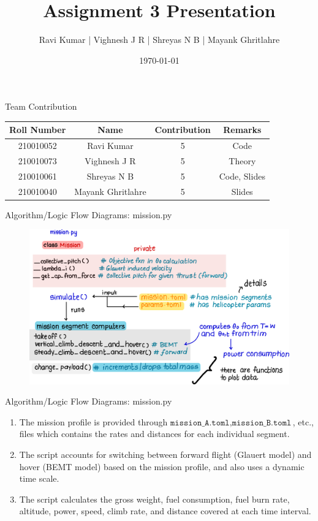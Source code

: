 \documentclass{beamer}
\title{Assignment 3 Presentation}
\date{\today}
\author{Ravi Kumar | Vighnesh J R | Shreyas N B | Mayank Ghritlahre}
\institute{AE667 Rotary Wing Aerodynamics - Group 1}
\begin{document}
\maketitle


\begin{frame}{Team Contribution}
    \begin{table}
        \centering
        \begin{tabular}{|c|c|c|c|} \hline 
            \textbf{Roll Number} & \textbf{Name} & \textbf{Contribution} & \textbf{Remarks}\\ \hline 
            210010052 & Ravi Kumar & 5 & Code \\
            210010073 & Vighnesh J R & 5 & Theory\\ 
            210010061 & Shreyas N B & 5 & Code, Slides\\ 
            210010040 & Mayank Ghritlahre & 5 & Slides\\ \hline
        \end{tabular}
    \end{table}
\end{frame}

  

%
% 

\begin{frame}{Algorithm/Logic Flow Diagrams: mission.py}
    \begin{figure}
      \centering
      \includegraphics[width=\linewidth]{../images/mission.jpeg}
    \end{figure}
\end{frame}

\begin{frame}{Algorithm/Logic Flow Diagrams: mission.py}
    \begin{enumerate}
      \item The mission profile is provided through $\texttt{mission\_A.toml}, \texttt{mission\_B.toml}$, etc., files which contains the rates and distances for each individual segment.
      \item The script accounts for switching between forward flight (Glauert model) and hover (BEMT model) based on the mission profile, and also uses a dynamic time scale.
      \item The script calculates the gross weight, fuel consumption, fuel burn rate, altitude, power, speed, climb rate, and distance covered at each time interval.
    \end{enumerate}
\end{frame}
\end{document}
